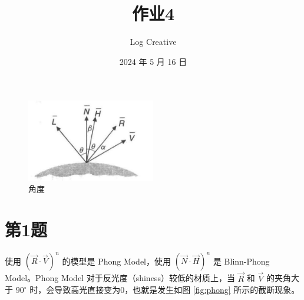 \documentclass[math-font=newcm]{sjtuarticle}
\title{作业4}
\author{Log Creative}
\date{2024 年 5 月 16 日}
\begin{document}
\maketitle

\tableofcontents*

\begin{figure}[h]
    \centering
    \includegraphics[width=0.5\textwidth]{angles.jpg}
    \caption{角度}
    \label{fig:angles}    
\end{figure}

\section{第1题}

使用 $(\overrightarrow{R}\cdot\overrightarrow{V})^n$ 的模型是 Phong Model，使用 $(\overrightarrow{N}\cdot\overrightarrow{H})^n$ 是 Blinn-Phong Model。Phong Model 对于反光度（shiness）较低的材质上，当 $\overrightarrow{R}$ 和 $\overrightarrow{V}$ 的夹角大于 $90^\circ$ 时，会导致高光直接变为0，也就是发生如图 \ref{fig:phong} 所示的截断现象。
\end{document}
